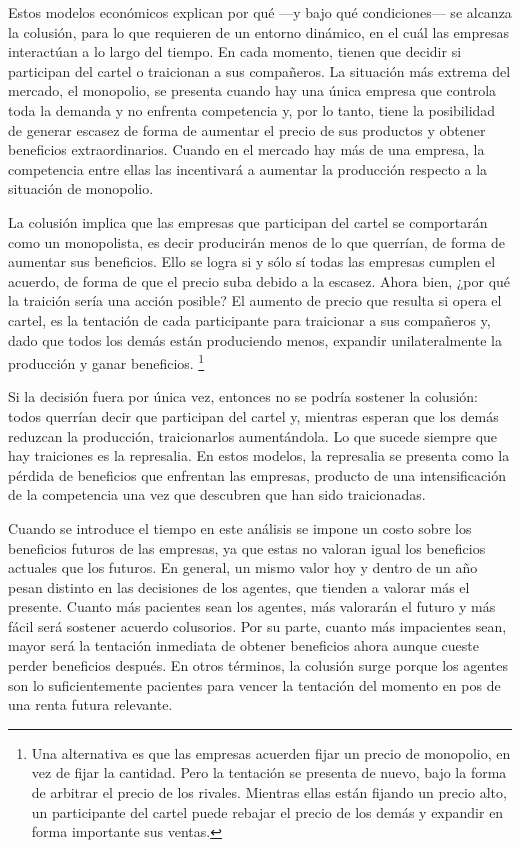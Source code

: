 \documentclass[
  12pt,
  spanish,
]{book}
\begin{document}
Estos modelos económicos explican por qué ---y bajo qué condiciones---
se alcanza la colusión, para lo que requieren de un entorno dinámico, en
el cuál las empresas interactúan a lo largo del tiempo. En cada momento,
tienen que decidir si participan del cartel o traicionan a sus
compañeros. La situación más extrema del mercado, el monopolio, se
presenta cuando hay una única empresa que controla toda la demanda y no
enfrenta competencia y, por lo tanto, tiene la posibilidad de generar
escasez de forma de aumentar el precio de sus productos y obtener
beneficios extraordinarios. Cuando en el mercado hay más de una empresa,
la competencia entre ellas las incentivará a aumentar la producción
respecto a la situación de monopolio.

La colusión implica que las empresas que participan del cartel se
comportarán como un monopolista, es decir producirán menos de lo que
querrían, de forma de aumentar sus beneficios. Ello se logra si y sólo
sí todas las empresas cumplen el acuerdo, de forma de que el precio suba
debido a la escasez. Ahora bien, ¿por qué la traición sería una acción
posible? El aumento de precio que resulta si opera el cartel, es la
tentación de cada participante para traicionar a sus compañeros y, dado
que todos los demás están produciendo menos, expandir unilateralmente la
producción y ganar beneficios. \footnote{Una alternativa es que las
  empresas acuerden fijar un precio de monopolio, en vez de fijar la
  cantidad. Pero la tentación se presenta de nuevo, bajo la forma de
  arbitrar el precio de los rivales. Mientras ellas están fijando un
  precio alto, un participante del cartel puede rebajar el precio de los
  demás y expandir en forma importante sus ventas.}

Si la decisión fuera por única vez, entonces no se podría sostener la
colusión: todos querrían decir que participan del cartel y, mientras
esperan que los demás reduzcan la producción, traicionarlos
aumentándola. Lo que sucede siempre que hay traiciones es la represalia.
En estos modelos, la represalia se presenta como la pérdida de
beneficios que enfrentan las empresas, producto de una intensificación
de la competencia una vez que descubren que han sido traicionadas.

Cuando se introduce el tiempo en este análisis se impone un costo sobre
los beneficios futuros de las empresas, ya que estas no valoran igual
los beneficios actuales que los futuros. En general, un mismo valor hoy
y dentro de un año pesan distinto en las decisiones de los agentes, que
tienden a valorar más el presente. Cuanto más pacientes sean los
agentes, más valorarán el futuro y más fácil será sostener acuerdo
colusorios. Por su parte, cuanto más impacientes sean, mayor será la
tentación inmediata de obtener beneficios ahora aunque cueste perder
beneficios después. En otros términos, la colusión surge porque los
agentes son lo suficientemente pacientes para vencer la tentación del
momento en pos de una renta futura relevante.
\end{document}
